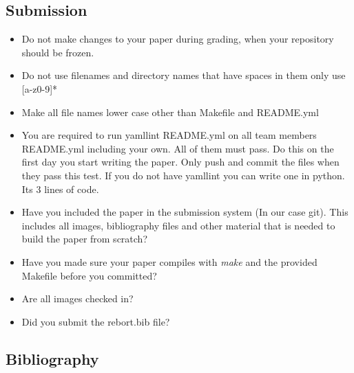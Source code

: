 \subsection{Submission}

\begin{itemize}[label=$\Box$]
    \item Do not make changes to your paper during grading, when your
      repository should be frozen.
     \item Do not use filenames and directory names that have spaces
       in them only use [a-z0-9]*
     \item Make all file names lower case other than Makefile and
       README.yml
     \item You are required to run yamllint README.yml on all team
       members README.yml including your own. All of them must pass. Do this
       on the first day you start writing the paper. Only push and
       commit the files when they pass this test. If you do not have
       yamllint you can write one in python. Its 3 lines of code.
     \item Have you included the paper in the submission system (In
       our case git). This includes all images, bibliography files and
       other material that is needed to build the paper from scratch?
     \item Have you made sure your paper compiles with \textit{make} and
       the provided Makefile before you committed?
     \item Are all images checked in?
     \item Did you submit the rebort.bib file?
\end{itemize}

\subsection{Bibliography}

